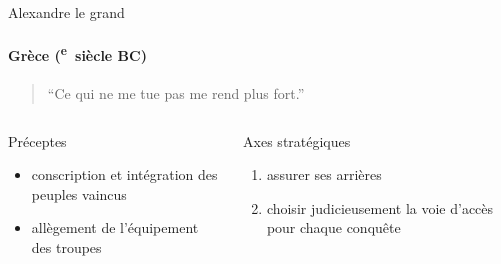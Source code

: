 \documentclass[utf8,hyperref={pagebackref}]{beamer}
\newcommand{\cRM}[1]{\MakeUppercase{\romannumeral #1}}  %
\newcommand{\siecle}[1]{\cRM{#1}\textsuperscript{e}~siècle}
\begin{document}
\begin{frame}{Alexandre le grand}
\framesubtitle{Grèce (\siecle{4} BC)}
\begin{quote}“Ce qui ne me tue pas me rend plus fort.”\end{quote}
\vfill
\begin{columns}[t]
\begin{column}{0.5\linewidth}
Préceptes
\begin{itemize}
\item conscription et intégration des peuples vaincus
\item allègement de l'équipement des troupes
\end{itemize}
\end{column}
\begin{column}{0.5\linewidth}
Axes stratégiques
\begin{enumerate}
\item assurer ses arrières
\item choisir judicieusement la voie d'accès pour chaque conquête
\end{enumerate}
\end{column}
\end{columns}
\end{frame}
\end{document}
